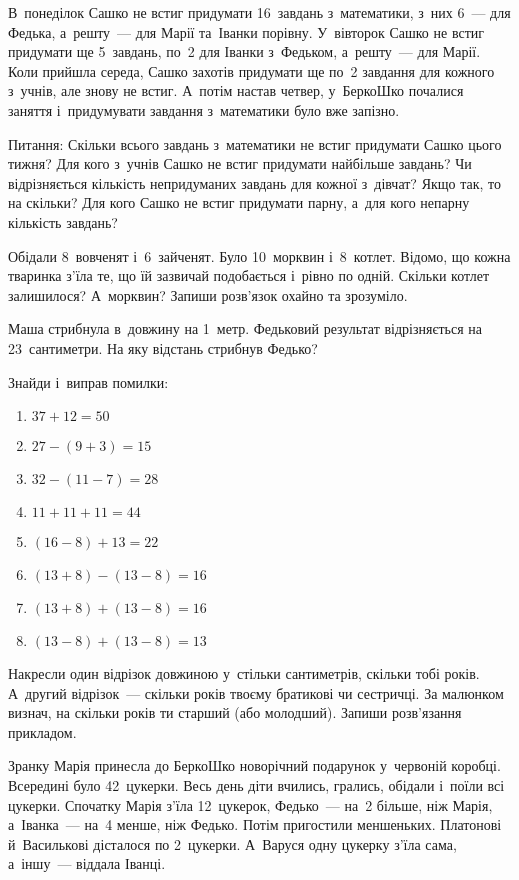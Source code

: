 \problem
В~понеділок Сашко не встиг придумати 16~завдань з~математики,
з~них 6~--- для Федька, а~решту~--- для Марії та~Іванки порівну.
У~вівторок Сашко не встиг придумати ще 5~завдань,
по~2 для Іванки з~Федьком, а~решту~--- для Марії.
Коли прийшла середа, Сашко захотів придумати
ще по~2 завдання для кожного з~учнів, але знову не встиг.
А~потім настав четвер, у~БеркоШко почалися заняття
і~придумувати завдання з~математики було вже запізно.

Питання:
Скільки всього завдань з~математики не встиг придумати Сашко цього тижня?
Для кого з~учнів Сашко не встиг придумати найбільше завдань?
Чи відрізняється кількість непридуманих завдань для кожної з~дівчат?
Якщо так, то на скільки?
Для кого Сашко не встиг придумати парну, а~для кого непарну кількість завдань?


\problem
Обідали 8~вовченят і~6~зайченят. Було 10~морквин і~8~котлет.
Відомо, що кожна тваринка з'їла те, що їй зазвичай подобається
і~рівно по одній.
Скільки котлет залишилося? А~морквин? Запиши розв'язок охайно та зрозуміло.


\problem
Маша стрибнула в~довжину на 1~метр.
Федьковий результат відрізняється на 23~сантиметри.
На яку відстань стрибнув Федько?


\problem
Знайди і~виправ помилки:
\begin{multicols}{2}
  \begin{enumerate}
    \item $37 + 12 = 50$
    \item $27 - (9 + 3) = 15$
    \item $32 - (11 - 7) = 28$
    \item $11 + 11 + 11 = 44$
    \item $(16 - 8) + 13 = 22$
    \item $(13 + 8) - (13 - 8) = 16$
    \item $(13 + 8) + (13 - 8) = 16$
    \item $(13 - 8) + (13 - 8) = 13$
  \end{enumerate}
\end{multicols}


\problem
Накресли один відрізок довжиною у~стільки сантиметрів, скільки тобі років.
А~другий відрізок~--- скільки років твоєму братикові чи сестричці.
За малюнком визнач, на скільки років ти старший (або молодший).
Запиши розв’язання прикладом.


\problem
Зранку Марія принесла до БеркоШко новорічний подарунок у~червоній коробці.
Всередині було 42~цукерки.
Весь день діти вчились, грались, обідали і~поїли всі цукерки.
Спочатку Марія з’їла 12~цукерок, Федько~--- на~2 більше, ніж Марія,
а~Іванка~--- на~4 менше, ніж Федько.
Потім пригостили меншеньких.
Платонові й~Василькові дісталося по 2~цукерки.
А~Варуся одну цукерку з’їла сама, а~іншу~--- віддала Іванці.

